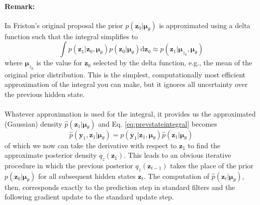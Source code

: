 \documentclass[a4paper,10pt]{article}
\newcommand{\bs}[1]{\mathbf{#1}}					%
\newcommand{\bgs}[1]{\boldsymbol{#1}}				%
\newcommand{\ud}{\mathrm{d}}					%
\newcommand{\eq}[1]{\begin{equation} #1 \end{equation}}%
\renewcommand{\ss}{z}         %
\newcommand{\so}{y}         %
\newcommand{\spm}{\mu}    %
\renewcommand{\sp}{\theta}    %
\newcommand{\ps}{\bs{\ss}}    %
\newcommand{\po}{\bs{\so}}    %
\newcommand{\ppm}{\bgs{\spm}}   %
\begin{document}
\paragraph{Remark:} In Friston's original proposal \cite{Friston2008a, Friston2008} the prior $p(\ps_0|\ppm_\sp)$ is approximated using a delta function such that the integral simplifies to
\eq{
    \int p(\ps_1|\ps_0,\ppm_\sp)p(\ps_0|\ppm_\sp) \ud\ps_0 \approx p(\ps_1|\ppm_{\ss_0}, \ppm_\sp)
}
where $\ppm_{\ss_0}$ is the value for $\ps_0$ selected by the delta function, e.g., the mean of the original prior distribution. This is the simplest, computationally most efficient approximation of the integral you can make, but it ignores all uncertainty over the previous hidden state.

\paragraph{}Whatever approximation is used for the integral, it provides us the approximated (Gaussian) density $\hat{p}(\ps_1|\ppm_\sp)$ and Eq. \ref{eq:prevstateintegral} becomes
\eq{
     \hat{p}(\po_1,\ps_1|\ppm_\sp) = p(\po_1|\ps_1,\ppm_\sp) \hat{p}(\ps_1|\ppm_\sp)
}
of which we now can take the derivative with respect to $\ps_1$ to find the approximate posterior density $q_\ss(\ps_1)$. This leads to an obvious iterative procedure in which the previous posterior $q_\ss(\ps_{t-1})$ takes the place of the prior $p(\ps_0|\ppm_\sp)$ for all subsequent hidden states $\ps_t$. The computation of $\hat{p}(\ps_t|\ppm_\sp)$, then, corresponds exactly to the prediction step in standard filters and the following gradient update to the standard update step. 
\end{document}

